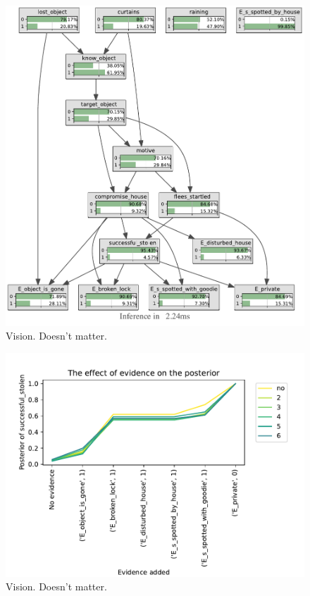 \begin{figure}[h!]
\begin{center}
\includegraphics[width=\linewidth]{../experiments/StolenLaptopVision/bnImage/BNIMAGEStolenLaptopVision.pdf}
\caption{Vision. Doesn't matter.}
\label{visionlaptopPosterior}
\end{center}
\end{figure}


\begin{figure}[h!]
\begin{center}
\includegraphics[width=\linewidth]{../experiments/StolenLaptopVision/plots/posterior_StolenLaptopVision.pdf}
\caption{Vision. Doesn't matter.}
\label{visionlaptopPosterior}
\end{center}
\end{figure}



